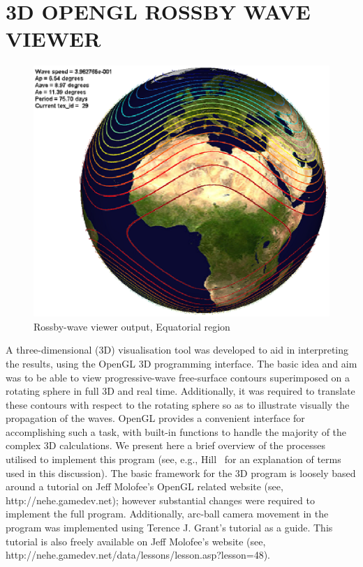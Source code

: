
\chapter[3D OPENGL ROSSBY WAVE VIEWER]{3D OPENGL ROSSBY WAVE VIEWER}
\label{App:3}

\begin{figure}[htbp]
	\centering
		\includegraphics[scale=0.80]{viewer/view1.eps}
	\caption{Rossby-wave viewer output, Equatorial region}
	\label{fig:view1}
\end{figure}

A three-dimensional (3D) visualisation tool was developed to aid in interpreting the results, using the OpenGL 3D programming interface. The basic idea and aim was to be able to view progressive-wave free-surface contours superimposed on a rotating sphere in full 3D and real time. Additionally, it was required to translate these contours with respect to the rotating sphere so as to illustrate visually the propagation of the waves. OpenGL provides a convenient interface for accomplishing such a task, with built-in functions to handle the majority of the complex 3D calculations. We present here a brief overview of the processes utilised to implement this program (see, e.g., Hill~\cite{Hill:CGU} for an explanation of terms used in this discussion). The basic framework for the 3D program is loosely based around a tutorial on Jeff Molofee's OpenGL related website (see, http://nehe.gamedev.net); however substantial changes were required to implement the full program. Additionally, arc-ball camera movement in the program was implemented using Terence J. Grant's tutorial as a guide. This tutorial is also freely available on Jeff Molofee's website (see, http://nehe.gamedev.net/data/lessons/lesson.asp?lesson=48).

